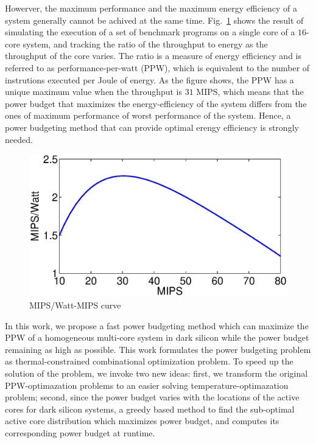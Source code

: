 
Howerver, the maximum performance and the maximum energy efficiency of a system generally cannot be achived at the same time. Fig.~\ref{fig:ppw_mips} shows the result of simulating the execution of a set of benchmark programs on a single core of a $16$-core system, and tracking the ratio of the throughput to energy as the throughput of the core varies. The ratio is a measure of energy efficiency and is referred to as performance-per-watt (PPW), which is equivalent to the number of instrutions executed per Joule of energy. As the figure shows, the PPW has a unique maximum value when the throughput is $31$ MIPS, which means that the power budget that maximizes the energy-efficiency of the system differs from the ones of maximum performance of worst performance of the system. Hence, a power budgeting method that can provide optimal erengy efficiency is strongly needed.



\begin{figure}
\centering
\includegraphics[width=1\linewidth]{fig/ppw_mips.eps}
\caption{MIPS/Watt-MIPS curve}
\label{fig:ppw_mips}
\end{figure}

In this work, we propose a fast power budgeting method which can maximize the PPW of a homogeneous multi-core system in dark silicon while the power budget remaining as high as possible. This work formulates the power budgeting problem as thermal-constrained combinational optimization problem. To speed up the solution of the problem, we invoke two new ideas: first, we transform the original PPW-optimazation problems to an easier solving temperature-optimazation problem; second, since the power budget varies with the locations of the active cores for dark silicon systems, a greedy based method to find the sub-optimal active core distribution which maximizes power budget, and computes its corresponding power budget at runtime.


